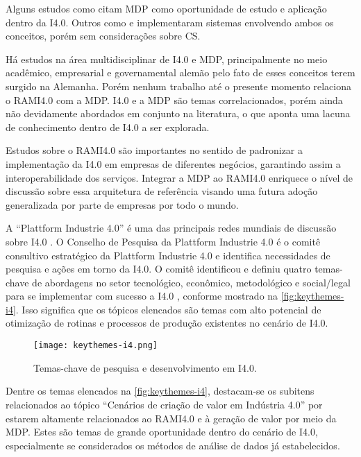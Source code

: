 Alguns estudos como  citam MDP como oportunidade de estudo e aplicação dentro da I4.0. Outros como  e  implementaram sistemas envolvendo ambos os conceitos, porém sem considerações sobre CS.

Há estudos na área multidisciplinar de I4.0 e MDP, principalmente no meio acadêmico, empresarial e governamental alemão pelo fato de esses conceitos terem surgido na Alemanha. Porém nenhum trabalho até o presente momento relaciona o RAMI4.0 com a MDP. I4.0 e a MDP são temas correlacionados, porém ainda não devidamente abordados em conjunto na literatura, o que aponta uma lacuna de conhecimento dentro de I4.0 a ser explorada.

Estudos sobre o RAMI4.0 são importantes no sentido de padronizar a implementação da I4.0 em empresas de diferentes negócios, garantindo assim a interoperabilidade dos serviços. Integrar a MDP ao RAMI4.0 enriquece o nível de discussão sobre essa arquitetura de referência visando uma futura adoção generalizada por parte de empresas por todo o mundo.

A ``Plattform Industrie 4.0'' é uma das principais redes mundiais de discussão sobre I4.0 \cite{kagermann2013recommendations, acatech2014plattform, hartmut2019plattform}. O Conselho de Pesquisa da Plattform Industrie 4.0 é o comitê consultivo estratégico da Plattform Industrie 4.0 e identifica necessidades de pesquisa e ações em torno da I4.0. O comitê identificou e definiu quatro temas-chave de abordagens no setor tecnológico, econômico, metodológico e social/legal para se implementar com sucesso a I4.0 \cite{hirsch-kreinsen2019keythemes}, conforme mostrado na \autoref{fig:keythemes-i4}. Isso significa que os tópicos elencados são temas com alto potencial de otimização de rotinas e processos de produção existentes no cenário de I4.0.

\begin{figure}[htb]
	\centering
	\texttt{[image: keythemes-i4.png]}
	\caption{Temas-chave de pesquisa e desenvolvimento em I4.0.}
	\label{fig:keythemes-i4}
\end{figure}

Dentre os temas elencados na \autoref{fig:keythemes-i4}, destacam-se os subitens relacionados ao tópico ``Cenários de criação de valor em Indústria 4.0'' por estarem altamente relacionados ao RAMI4.0 e à geração de valor por meio da MDP. Estes são temas de grande oportunidade dentro do cenário de I4.0, especialmente se considerados os métodos de análise de dados já estabelecidos.

